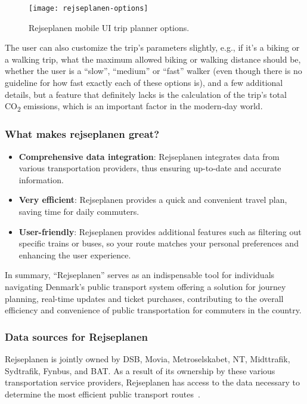 \begin{figure}
    \centering
    \texttt{[image: rejseplanen-options]}
    \caption{Rejseplanen mobile UI trip planner options.}
    \label{fig:figure9}
\end{figure}

The user can also customize the trip's parameters slightly, e.g., if it's a biking or a walking trip, what the maximum
allowed biking or walking distance should be, whether the user is a ``slow'', ``medium'' or ``fast'' walker (even though
there is no guideline for how fast exactly each of these options is), and a few additional details, but a feature that
definitely lacks is the calculation of the trip’s total \unit{CO_{2}} emissions, which is an important factor in the
modern-day world.

\subsubsection{What makes rejseplanen great?}
\begin{itemize}
    \item \textbf{Comprehensive data integration}: Rejseplanen integrates data from various transportation providers,
    thus ensuring up-to-date and accurate information.
    \item \textbf{Very efficient}: Rejseplanen provides a quick and convenient travel plan, saving time for daily
    commuters.
    \item \textbf{User-friendly}: Rejseplanen provides additional features such as filtering out specific trains or
    buses, so your route matches your personal preferences and enhancing the user experience.
\end{itemize}

In summary, ``Rejseplanen'' serves as an indispensable tool for individuals navigating Denmark's public transport system
offering a solution for journey planning, real-time updates and ticket purchases, contributing to the overall efficiency
and convenience of public transportation for commuters in the country.

\subsubsection{Data sources for Rejseplanen}

Rejseplanen is jointly owned by DSB, Movia, Metroselskabet, NT, Midttrafik, Sydtrafik, Fynbus, and BAT\@.
As a result of its ownership by these various transportation service providers, Rejseplanen has access to the data
necessary to determine the most efficient public transport routes~\cite{rejseplanen2023}.

